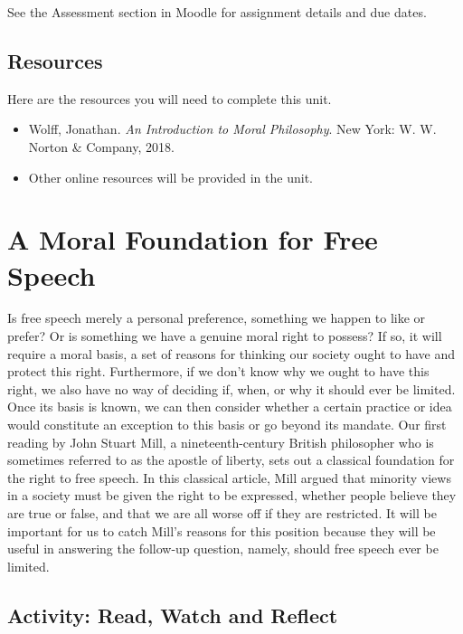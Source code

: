 \documentclass[
]{book}
\providecommand{\tightlist}{%
  \setlength{\itemsep}{0pt}\setlength{\parskip}{0pt}}
\begin{document}
See the Assessment section in Moodle for assignment details and due dates.

\hypertarget{resources-2}{%
\subsection*{Resources}\label{resources-2}}

Here are the resources you will need to complete this unit.

\begin{itemize}
\tightlist
\item
  Wolff, Jonathan. \emph{An Introduction to Moral Philosophy}. New York: W. W. Norton \& Company, 2018.
\item
  Other online resources will be provided in the unit.
\end{itemize}

\hypertarget{a-moral-foundation-for-free-speech}{%
\section{A Moral Foundation for Free Speech}\label{a-moral-foundation-for-free-speech}}

Is free speech merely a personal preference, something we happen to like or prefer? Or is something we have a genuine moral right to possess? If so, it will require a moral basis, a set of reasons for thinking our society ought to have and protect this right. Furthermore, if we don't know why we ought to have this right, we also have no way of deciding if, when, or why it should ever be limited. Once its basis is known, we can then consider whether a certain practice or idea would constitute an exception to this basis or go beyond its mandate. Our first reading by John Stuart Mill, a nineteenth-century British philosopher who is sometimes referred to as the apostle of liberty, sets out a classical foundation for the right to free speech. In this classical article, Mill argued that minority views in a society must be given the right to be expressed, whether people believe they are true or false, and that we are all worse off if they are restricted. It will be important for us to catch Mill's reasons for this position because they will be useful in answering the follow-up question, namely, should free speech ever be limited.

\hypertarget{activity-read-watch-and-reflect-5}{%
\subsection*{Activity: Read, Watch and Reflect}\label{activity-read-watch-and-reflect-5}}
\end{document}
